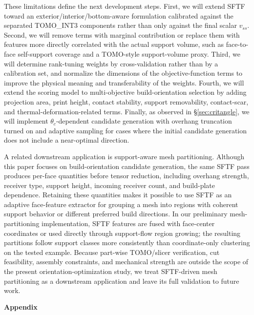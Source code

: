 \documentclass[11pt,a4paper]{article}
\begin{document}
These limitations define the next development steps.
First, we will extend SFTF toward an exterior/interior/bottom-aware formulation calibrated against the separated TOMO\_INT3 components rather than only against the final scalar $v_{ss}$.
Second, we will remove terms with marginal contribution or replace them with features more directly correlated with the actual support volume,
such as face-to-face self-support coverage and a TOMO-style support-volume proxy.
Third, we will determine rank-tuning weights by cross-validation rather than by a calibration set, and normalize the dimensions of the objective-function terms
to improve the physical meaning and transferability of the weights.
Fourth, we will extend the scoring model to multi-objective build-orientation selection by adding projection area, print height, contact stability,
support removability, contact-scar, and thermal-deformation-related terms.
Finally, as observed in \S\ref{sec:critangle}, we will implement $\theta_c$-dependent candidate generation with overhang truncation turned on
and adaptive sampling for cases where the initial candidate generation does not include a near-optimal direction.

A related downstream application is support-aware mesh partitioning.
Although this paper focuses on build-orientation candidate generation, the same SFTF pass produces per-face quantities before tensor reduction,
including overhang strength, receiver type, support height, incoming receiver count, and build-plate dependence.
Retaining these quantities makes it possible to use SFTF as an adaptive face-feature extractor for grouping a mesh into regions with coherent support behavior
or different preferred build directions.
In our preliminary mesh-partitioning implementation, SFTF features are fused with face-center coordinates or used directly through support-flow region growing;
the resulting partitions follow support classes more consistently than coordinate-only clustering on the tested example.
Because part-wise TOMO/slicer verification, cut feasibility, assembly constraints, and mechanical strength are outside the scope of the present orientation-optimization study,
we treat SFTF-driven mesh partitioning as a downstream application and leave its full validation to future work.

\appendix

\clearpage
\begin{center}
{\LARGE\bfseries Appendix}
\end{center}
\vspace{1em}
\end{document}
